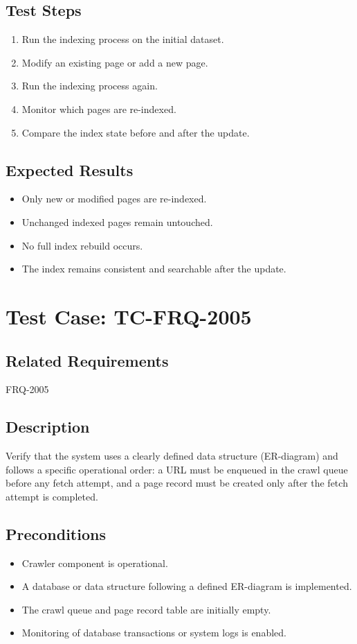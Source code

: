 \documentclass{article}
\begin{document}
\subsection*{Test Steps}
\begin{enumerate}
  \item Run the indexing process on the initial dataset.
  \item Modify an existing page or add a new page.
  \item Run the indexing process again.
  \item Monitor which pages are re-indexed.
  \item Compare the index state before and after the update.
\end{enumerate}

\subsection*{Expected Results}
\begin{itemize}
  \item Only new or modified pages are re-indexed.
  \item Unchanged indexed pages remain untouched.
  \item No full index rebuild occurs.
  \item The index remains consistent and searchable after the update.
\end{itemize}


\section{Test Case: TC-FRQ-2005}

\subsection*{Related Requirements}
FRQ-2005

\subsection*{Description}
Verify that the system uses a clearly defined data structure (ER-diagram) and follows a specific operational order: 
a URL must be enqueued in the crawl queue before any fetch attempt, and a page record must be created only after the fetch attempt is completed.

\subsection*{Preconditions}
\begin{itemize}
  \item Crawler component is operational.
  \item A database or data structure following a defined ER-diagram is implemented.
  \item The crawl queue and page record table are initially empty.
  \item Monitoring of database transactions or system logs is enabled.
\end{itemize}
\end{document}
